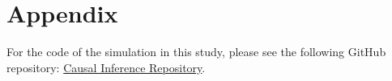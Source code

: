 \documentclass{article}
\begin{document}
\section{Appendix}

For the code of the simulation in this study, please see the following GitHub repository: \href{https://github.com/Vindmn1234/Causal-Inference.git}{Causal Inference Repository}.


\newpage


\end{document}
